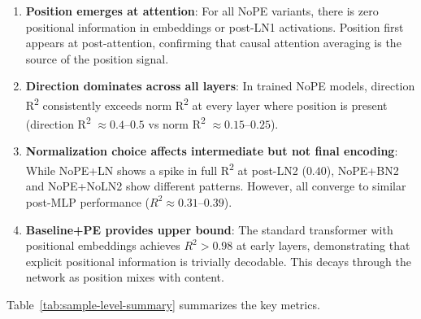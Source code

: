 \documentclass[11pt]{article}
\begin{document}
\begin{enumerate}
    \item \textbf{Position emerges at attention}: For all NoPE variants, there is zero positional information in embeddings or post-LN1 activations. Position first appears at post-attention, confirming that causal attention averaging is the source of the position signal.
    
    \item \textbf{Direction dominates across all layers}: In trained NoPE models, direction R\textsuperscript{2} consistently exceeds norm R\textsuperscript{2} at every layer where position is present (direction R\textsuperscript{2} $\approx 0.4$--$0.5$ vs norm R\textsuperscript{2} $\approx 0.15$--$0.25$).
    
    \item \textbf{Normalization choice affects intermediate but not final encoding}: While NoPE+LN shows a spike in full R\textsuperscript{2} at post-LN2 ($0.40$), NoPE+BN2 and NoPE+NoLN2 show different patterns. However, all converge to similar post-MLP performance ($R^2 \approx 0.31$--$0.39$).
    
    \item \textbf{Baseline+PE provides upper bound}: The standard transformer with positional embeddings achieves $R^2 > 0.98$ at early layers, demonstrating that explicit positional information is trivially decodable. This decays through the network as position mixes with content.
\end{enumerate}

Table~\ref{tab:sample-level-summary} summarizes the key metrics.
\end{document}
